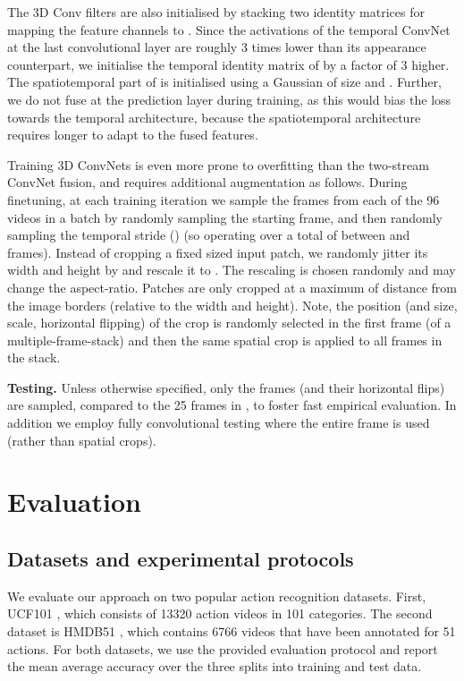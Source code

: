 \documentclass[10pt,twocolumn,letterpaper]{article}
\begin{document}
The 3D Conv filters are also initialised by stacking two identity
matrices for mapping the  feature channels to .  Since the
activations of the temporal ConvNet at the last convolutional layer are
roughly 3 times lower than its appearance counterpart, we initialise
the temporal identity matrix of  by a factor of 3 higher. 
The spatiotemporal part of 
is initialised using a Gaussian of
size  and .
Further, we do not fuse at the prediction layer during training, as
this would bias the loss towards the temporal architecture, because
the spatiotemporal architecture requires longer to adapt to the fused
features. 

Training 3D ConvNets is
even more prone to overfitting than the two-stream ConvNet fusion, 
and requires additional augmentation as follows.
During finetuning, at each 
training iteration we sample the  frames from each of
the 96 videos in a batch by randomly sampling 
the starting frame, and then randomly sampling the temporal stride () 
 (so 
operating over a total of between   and  frames). 
Instead of cropping a fixed sized  input patch, we randomly jitter its width and height by  and
rescale it to . The rescaling is chosen randomly and
may change the aspect-ratio. 
Patches are only cropped at a maximum of 
distance from the image borders (relative to the width and height).
Note, the position (and size, scale, horizontal flipping) of the crop is 
randomly selected in the first frame (of a multiple-frame-stack) and then
the same spatial crop is applied to all frames in the stack. 


\textbf{Testing.} Unless otherwise specified, only the  frames (and their
horizontal flips) are sampled, compared to the 25 frames in \cite{Simonyan14b}, to
foster fast empirical evaluation. In addition we employ fully convolutional testing where the entire frame is used (rather than
spatial crops).



 	\section{Evaluation} \label{sec:evaluation}
\subsection{Datasets and experimental protocols}
We evaluate our approach on two popular action recognition datasets. First, UCF101 \cite{UCF101}, which consists of 13320 action videos in 101 categories. 
The second dataset is HMDB51 \cite{kuehne2011hmdb}, which contains 6766 videos that have been annotated for 51 actions. 
For both datasets, we use the provided evaluation protocol and report the mean average accuracy over the three splits into training and test data. 
\end{document}
